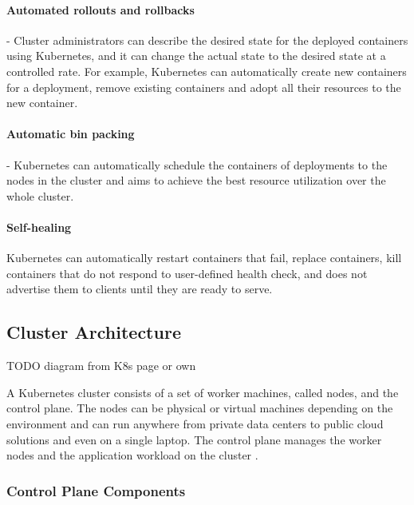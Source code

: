 \paragraph{Automated rollouts and rollbacks} - Cluster administrators can describe the desired state for the deployed containers using Kubernetes, and it can change the actual state to the desired state at a controlled rate. For example, Kubernetes can automatically create new containers for a deployment, remove existing containers and adopt all their resources to the new container.

\paragraph{Automatic bin packing} - Kubernetes can automatically schedule the containers of deployments to the nodes in the cluster and aims to achieve the best resource utilization over the whole cluster.

\paragraph{Self-healing} Kubernetes can automatically restart containers that fail, replace containers, kill containers that do not respond to user-defined health check, and does not advertise them to clients until they are ready to serve.

\subsection{Cluster Architecture}

TODO
diagram from K8s page or own


A Kubernetes cluster consists of a set of worker machines, called nodes, and the control plane. The nodes can be physical or virtual machines depending on the environment and can run anywhere from private data centers to public cloud solutions and even on a single laptop. The control plane manages the worker nodes and the application workload on the cluster \cite{KubernetesArchitecture}.

\subsubsection{Control Plane Components}

